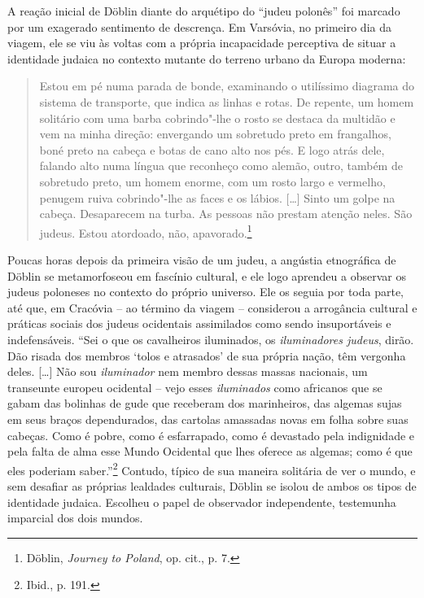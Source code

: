 A reação inicial de Döblin diante do arquétipo do ``judeu polonês'' foi
marcado por um exagerado sentimento de descrença. Em Varsóvia, no
primeiro dia da viagem, ele se viu às voltas com a própria incapacidade
perceptiva de situar a identidade judaica no contexto mutante do terreno
urbano da Europa moderna:

\begin{quote}
Estou em pé numa parada de bonde, examinando o utilíssimo diagrama do
sistema de transporte, que indica as linhas e rotas. De repente, um
homem solitário com uma barba cobrindo"-lhe o rosto se destaca da
multidão e vem na minha direção: envergando um sobretudo preto em
frangalhos, boné preto na cabeça e botas de cano alto nos pés. E logo
atrás dele, falando alto numa língua que reconheço como alemão, outro,
também de sobretudo preto, um homem enorme, com um rosto largo e
vermelho, penugem ruiva cobrindo"-lhe as faces e os lábios. [\ldots{}]
Sinto um golpe na cabeça. Desaparecem na turba. As pessoas não prestam
atenção neles. São judeus. Estou atordoado, não, apavorado.\footnote{Döblin, \textit{Journey to Poland}, op. cit., p. 7.} 
\end{quote}

Poucas horas depois da primeira visão de um judeu, a angústia
etnográfica de Döblin se metamorfoseou em fascínio cultural, e ele logo
aprendeu a observar os judeus poloneses no contexto do próprio universo.
Ele os seguia por toda parte, até que, em Cracóvia -- ao término da
viagem -- considerou a arrogância cultural e práticas sociais dos judeus
ocidentais assimilados como sendo insuportáveis e indefensáveis. ``Sei o
que os cavalheiros iluminados, os \textit{iluminadores judeus}, dirão. Dão risada
dos membros `tolos e atrasados' de sua própria nação, têm vergonha
deles. [\ldots{}] Não sou \textit{iluminador} nem membro dessas massas nacionais,
um transeunte europeu ocidental -- vejo esses \textit{iluminados} como africanos
que se gabam das bolinhas de gude que receberam dos marinheiros, das
algemas sujas em seus braços dependurados, das cartolas amassadas novas
em folha sobre suas cabeças. Como é pobre, como é esfarrapado, como é
devastado pela indignidade e pela falta de alma esse Mundo Ocidental que
lhes oferece as algemas; como é que eles poderiam saber.''\footnote{Ibid., p. 191.} Contudo, típico de sua maneira solitária de ver o mundo, e sem desafiar as próprias lealdades culturais, Döblin se isolou de ambos
os tipos de identidade judaica. Escolheu o papel de observador
independente, testemunha imparcial dos dois mundos.


